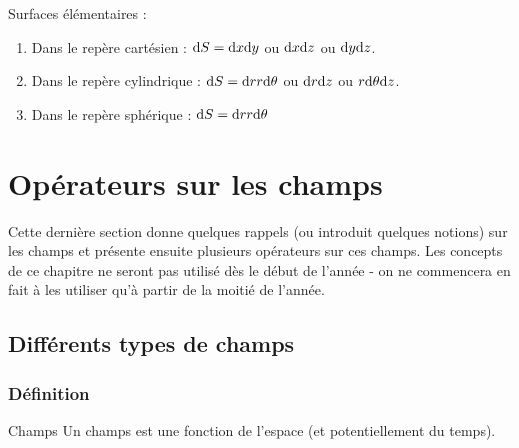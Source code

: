\documentclass[a4paper,french,bookmarks]{book}
\begin{document}
    Surfaces élémentaires :
    
    \begin{enumerate}
        \item Dans le repère cartésien : $\mathrm d S = \mathrm d x \mathrm d y$ ou $\mathrm d x \mathrm d z$ ou $\mathrm d y \mathrm d z$.
        
        \item Dans le repère cylindrique : $\mathrm d S = \mathrm d r r \mathrm d \theta$ ou $\mathrm d r \mathrm d z$ ou $r \mathrm d \theta \mathrm d z$.
        
        \item Dans le repère sphérique : $\mathrm d S = \mathrm d r r \mathrm d \theta$
    \end{enumerate}

    
    \section{Opérateurs sur les champs}
    
    Cette dernière section donne quelques rappels (ou introduit quelques notions) sur les champs et présente ensuite plusieurs opérateurs sur ces champs. Les concepts de ce chapitre ne seront pas utilisé dès le début de l'année - on ne commencera en fait à les utiliser qu'à partir de la moitié de l'année.
    
    \subsection{Différents types de champs}
    
    \subsubsection{Définition}
    
    \begin{definition}{Champs}{}
        Un champs est une fonction de l'espace (et potentiellement du temps).
    \end{definition}
    
\end{document}
